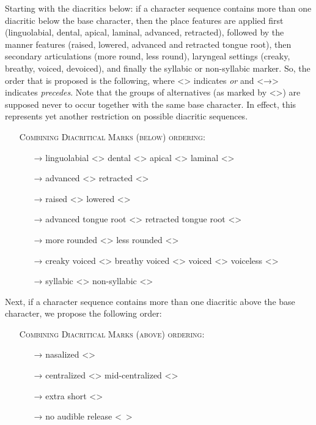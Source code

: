 Starting with the diacritics below: if a character sequence contains more than
one diacritic below the base character, then the place features are applied
first (linguolabial, dental, apical, laminal, advanced, retracted), followed by
the manner features (raised, lowered, advanced and retracted tongue root), then
secondary articulations (more round, less round), laryngeal settings (creaky,
breathy, voiced, devoiced), and finally the syllabic or non-syllabic marker. So,
the order that is proposed is the following, where <\textbar{}> indicates
\textit{or} and <→> indicates \textit{precedes}. Note that the groups of
alternatives (as marked by <\textbar{}>) are supposed never to occur together
with the same base character. In effect, this represents yet another restriction
on possible diacritic sequences.

\begin{itemize}
	\item[] \textsc{Combining Diacritical Marks (below) ordering:}
	\begin{itemize}	
	  \item[→] linguolabial <> \textbar{} dental <> \textbar{} apical <> \textbar{} laminal <>
	  \item[→] advanced <> \textbar{} retracted <> 
	  \item[→] raised <> \textbar{} lowered <>
	  \item[→] advanced tongue root <> \textbar{} retracted tongue root <>
	  \item[→] more rounded <> \textbar{} less rounded <>
	  \item[→] creaky voiced <> \textbar{} breathy voiced <> \textbar{} voiced <> \textbar{} voiceless <>
	  \item[→] syllabic <> \textbar{} non-syllabic <>
	\end{itemize}
 \end{itemize}

\noindent Next, if a character sequence contains more than one diacritic above the base
character, we propose the following order:

\begin{itemize}
	\item[] \textsc{Combining Diacritical Marks (above) ordering:}
	\begin{itemize}
	  \item[→] nasalized <>
	  \item[→] centralized <> \textbar{} mid-centralized <>
	  \item[→] extra short <>
	  \item[→] no audible release <\ >
 \end{itemize} \end{itemize}

